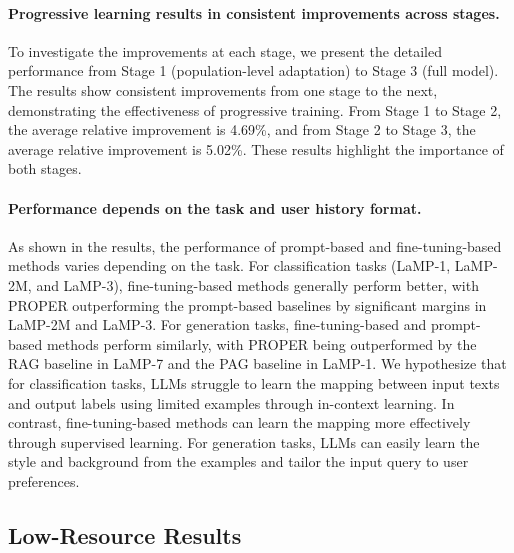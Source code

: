 \documentclass[11pt]{article}
\begin{document}
\paragraph{Progressive learning results in consistent improvements across stages.}
To investigate the improvements at each stage, we present the detailed performance from Stage 1 (population-level adaptation) to Stage 3 (full model). 
The results show consistent improvements from one stage to the next, demonstrating the effectiveness of progressive training. 
From Stage 1 to Stage 2, the average relative improvement is 4.69\%, and from Stage 2 to Stage 3, the average relative improvement is 5.02\%. These results highlight the importance of both stages.

\paragraph{Performance depends on the task and user history format.}
As shown in the results, the performance of prompt-based and fine-tuning-based methods varies depending on the task.
For classification tasks (LaMP-1, LaMP-2M, and LaMP-3), fine-tuning-based methods generally perform better, with PROPER outperforming the prompt-based baselines by significant margins in LaMP-2M and LaMP-3.
For generation tasks, fine-tuning-based and prompt-based methods perform similarly, with PROPER being outperformed by the RAG baseline in LaMP-7 and the PAG baseline in LaMP-1.
We hypothesize that for classification tasks, LLMs struggle to learn the mapping between input texts and output labels using limited examples through in-context learning. 
In contrast, fine-tuning-based methods can learn the mapping more effectively through supervised learning. For generation tasks, LLMs can easily learn the style and background from the examples and tailor the input query to user preferences.


\subsection{Low-Resource Results}
\end{document}
